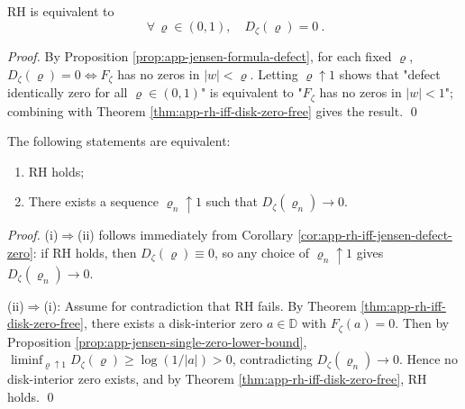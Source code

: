 \begin{corollary}\label{cor:app-rh-iff-jensen-defect-zero}
RH is equivalent to
\[
\boxed{\ \forall\,\varrho\in(0,1),\quad D_{\zeta}(\varrho)=0\ }.
\]
\end{corollary}
\begin{proof}
By Proposition \ref{prop:app-jensen-formula-defect}, for each fixed \(\varrho\), \(D_{\zeta}(\varrho)=0\iff F_{\zeta}\) has no zeros in \(|w|<\varrho\).
Letting \(\varrho\uparrow 1\) shows that "defect identically zero for all \(\varrho\in(0,1)\)" is equivalent to "\(F_{\zeta}\) has no zeros in \(|w|<1\)"; combining with Theorem \ref{thm:app-rh-iff-disk-zero-free} gives the result. \qed
\end{proof}

\begin{theorem}\label{thm:app-rh-iff-jensen-defect-vanishing-sequence}
The following statements are equivalent:
\begin{enumerate}
  \item[(i)] RH holds;
  \item[(ii)] There exists a sequence \(\varrho_n\uparrow 1\) such that \(D_{\zeta}(\varrho_n)\to 0\).
\end{enumerate}
\end{theorem}
\begin{proof}
(i)\(\Rightarrow\)(ii) follows immediately from Corollary \ref{cor:app-rh-iff-jensen-defect-zero}: if RH holds, then \(D_{\zeta}(\varrho)\equiv 0\), so any choice of \(\varrho_n\uparrow 1\) gives \(D_{\zeta}(\varrho_n)\to 0\).
\par
(ii)\(\Rightarrow\)(i): Assume for contradiction that RH fails.
By Theorem \ref{thm:app-rh-iff-disk-zero-free}, there exists a disk-interior zero \(a\in\mathbb{D}\) with \(F_{\zeta}(a)=0\).
Then by Proposition \ref{prop:app-jensen-single-zero-lower-bound},
\(
\liminf_{\varrho\uparrow 1}D_{\zeta}(\varrho)\ge \log(1/|a|)>0
\), contradicting \(D_{\zeta}(\varrho_n)\to 0\).
Hence no disk-interior zero exists, and by Theorem \ref{thm:app-rh-iff-disk-zero-free}, RH holds. \qed
\end{proof}


